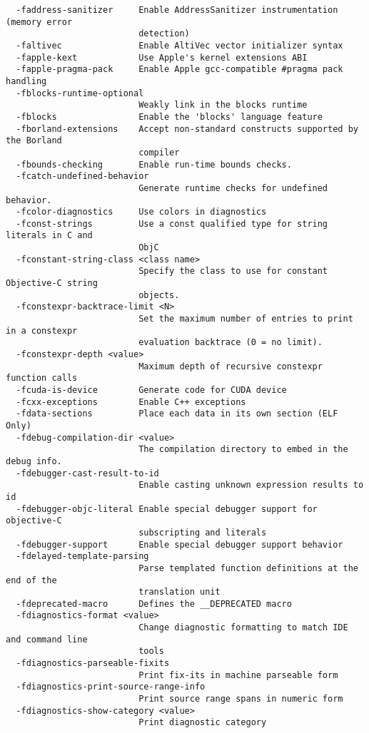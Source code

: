 \begin{verbatim}
  -faddress-sanitizer     Enable AddressSanitizer instrumentation (memory error 
                          detection)
  -faltivec               Enable AltiVec vector initializer syntax
  -fapple-kext            Use Apple's kernel extensions ABI
  -fapple-pragma-pack     Enable Apple gcc-compatible #pragma pack handling
  -fblocks-runtime-optional
                          Weakly link in the blocks runtime
  -fblocks                Enable the 'blocks' language feature
  -fborland-extensions    Accept non-standard constructs supported by the Borland 
                          compiler
  -fbounds-checking       Enable run-time bounds checks.
  -fcatch-undefined-behavior
                          Generate runtime checks for undefined behavior.
  -fcolor-diagnostics     Use colors in diagnostics
  -fconst-strings         Use a const qualified type for string literals in C and 
                          ObjC
  -fconstant-string-class <class name>
                          Specify the class to use for constant Objective-C string 
                          objects.
  -fconstexpr-backtrace-limit <N>
                          Set the maximum number of entries to print in a constexpr 
                          evaluation backtrace (0 = no limit).
  -fconstexpr-depth <value>
                          Maximum depth of recursive constexpr function calls
  -fcuda-is-device        Generate code for CUDA device
  -fcxx-exceptions        Enable C++ exceptions
  -fdata-sections         Place each data in its own section (ELF Only)
  -fdebug-compilation-dir <value>
                          The compilation directory to embed in the debug info.
  -fdebugger-cast-result-to-id
                          Enable casting unknown expression results to id
  -fdebugger-objc-literal Enable special debugger support for objective-C 
                          subscripting and literals
  -fdebugger-support      Enable special debugger support behavior
  -fdelayed-template-parsing
                          Parse templated function definitions at the end of the 
                          translation unit 
  -fdeprecated-macro      Defines the __DEPRECATED macro
  -fdiagnostics-format <value>
                          Change diagnostic formatting to match IDE and command line 
                          tools
  -fdiagnostics-parseable-fixits
                          Print fix-its in machine parseable form
  -fdiagnostics-print-source-range-info
                          Print source range spans in numeric form
  -fdiagnostics-show-category <value>
                          Print diagnostic category

\end{verbatim}
